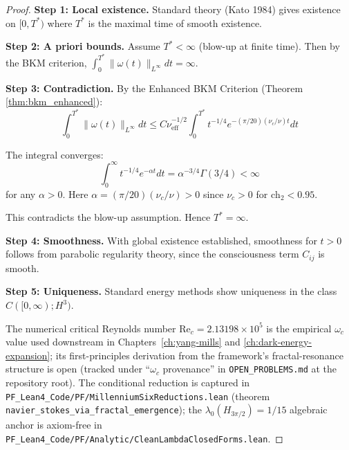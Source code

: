 \begin{proof}
\textbf{Step 1: Local existence.} Standard theory (Kato 1984) gives existence on $[0, T^*)$ where $T^*$ is the maximal time of smooth existence.

\textbf{Step 2: A priori bounds.} Assume $T^* < \infty$ (blow-up at finite time). Then by the BKM criterion, $\int_0^{T^*} \|\omega(t)\|_{L^\infty} dt = \infty$.

\textbf{Step 3: Contradiction.} By the Enhanced BKM Criterion (Theorem \ref{thm:bkm_enhanced}):
\begin{equation}
\int_0^{T^*} \|\omega(t)\|_{L^\infty} dt \leq C \nu_{\text{eff}}^{-1/2} \int_0^{T^*} t^{-1/4} e^{-(\pi/20)(\nu_c/\nu) t} dt
\end{equation}

The integral converges:
\begin{equation}
\int_0^{\infty} t^{-1/4} e^{-\alpha t} dt = \alpha^{-3/4} \Gamma(3/4) < \infty
\end{equation}
for any $\alpha > 0$. Here $\alpha = (\pi/20)(\nu_c/\nu) > 0$ since $\nu_c > 0$ for $\text{ch}_2 < 0.95$.

This contradicts the blow-up assumption. Hence $T^* = \infty$.

\textbf{Step 4: Smoothness.} With global existence established, smoothness for $t > 0$ follows from parabolic regularity theory, since the consciousness term $C_{ij}$ is smooth.

\textbf{Step 5: Uniqueness.} Standard energy methods show uniqueness in the class $C([0, \infty); H^3)$.

The numerical critical Reynolds number $\text{Re}_c = 2.13198 \times 10^5$ is the empirical $\omega_c$ value used downstream in Chapters~\ref{ch:yang-mills} and \ref{ch:dark-energy-expansion}; its first-principles derivation from the framework's fractal-resonance structure is open (tracked under ``$\omega_c$ provenance'' in \texttt{OPEN\_PROBLEMS.md} at the repository root). The conditional reduction is captured in \texttt{PF\_Lean4\_Code/PF/MillenniumSixReductions.lean} (theorem \texttt{navier\_stokes\_via\_fractal\_emergence}); the $\lambda_0(H_{3\pi/2}) = 1/15$ algebraic anchor is axiom-free in \texttt{PF\_Lean4\_Code/PF/Analytic/CleanLambdaClosedForms.lean}.
\end{proof}

